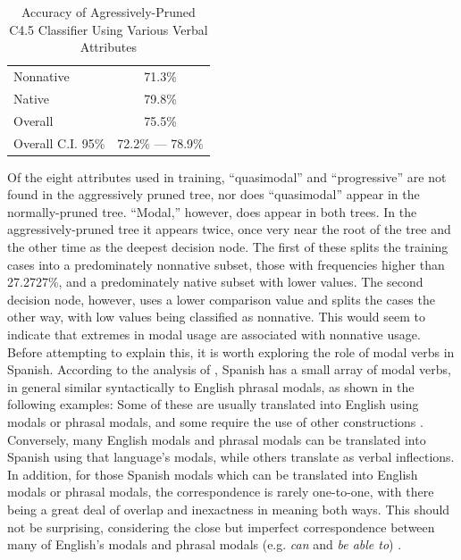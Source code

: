 \documentclass[main.tex]{subfiles}
\begin{document}
\begin{table}[htbp]
\centering
\caption{Accuracy of Agressively-Pruned C4.5 Classifier Using Various Verbal Attributes}
\begin{tabular}{l c}
\toprule
Nonnative & 71.3\% \\
Native & 79.8\% \\
Overall & 75.5\% \\
Overall C.I. 95\% & 72.2\% --- 78.9\%\\
\bottomrule
\end{tabular}
\label{table:pruned-basic-verb-results}
\end{table}
Of the eight attributes used in training, ``quasimodal'' and ``progressive'' are not found in the aggressively pruned tree, nor does ``quasimodal'' appear in the normally-pruned tree. ``Modal,'' however, does appear in both trees. In the aggressively-pruned tree it appears twice, once very near the root of the tree and the other time as the deepest decision node. The first of these splits the training cases into a predominately nonnative subset, those with frequencies higher than 27.2727\%, and a predominately native subset with lower values. The second decision node, however, uses a lower comparison value and splits the cases the other way, with low values being classified as nonnative. This would seem to indicate that extremes in modal usage are associated with nonnative usage. Before attempting to explain this, it is worth exploring the role of modal verbs in Spanish. According to the analysis of \citet{butt}, Spanish has a small array of modal verbs, in general similar syntactically to English phrasal modals, as shown in the following examples:
Some of these are usually translated into English using modals or phrasal modals, and some require the use of other constructions \citep[Ch. 21]{butt}. Conversely, many English modals and phrasal modals can be translated into Spanish using that language's modals, while others translate as verbal inflections. In addition, for those Spanish modals which can be translated into English modals or phrasal modals, the correspondence is rarely one-to-one, with there being a great deal of overlap and inexactness in meaning both ways. This should not be surprising, considering the close but imperfect correspondence between many of English's modals and phrasal modals (e.g. \textit{can} and \textit{be able to}) \citep[Ch. 8]{celce-murcia:1999}.
\end{document}
